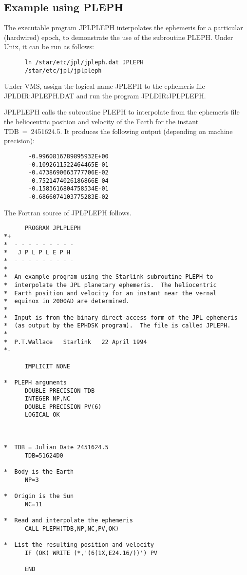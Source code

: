 \subsection{Example using PLEPH}
The executable program JPLPLEPH interpolates the ephemeris for a
particular (hardwired) epoch, to demonstrate
the use of the subroutine PLEPH. Under
Unix, it can be run as follows:
\begin{verbatim}
      ln /star/etc/jpl/jpleph.dat JPLEPH
      /star/etc/jpl/jplpleph
\end{verbatim}
Under VMS, assign the logical name JPLEPH to
the ephemeris file JPLDIR:JPLEPH.DAT
and run the program JPLDIR:JPLPLEPH.

JPLPLEPH calls the subroutine PLEPH to interpolate from the ephemeris file the
heliocentric position and velocity of the Earth for the instant
TDB~=~2451624.5.  It produces the following output (depending
on machine precision):

\begin{verbatim}
       -0.9960816789895932E+00
       -0.1092611522464465E-01
       -0.4738690663777706E-02
       -0.7521474026186866E-04
       -0.1583616804758534E-01
       -0.6866074103775283E-02
\end{verbatim}
The Fortran source of JPLPLEPH follows.
   
\begin{verbatim}
      PROGRAM JPLPLEPH
*+
*  - - - - - - - - -
*   J P L P L E P H
*  - - - - - - - - -
*
*  An example program using the Starlink subroutine PLEPH to
*  interpolate the JPL planetary ephemeris.  The heliocentric
*  Earth position and velocity for an instant near the vernal
*  equinox in 2000AD are determined.
*
*  Input is from the binary direct-access form of the JPL ephemeris
*  (as output by the EPHDSK program).  The file is called JPLEPH.
*
*  P.T.Wallace   Starlink   22 April 1994
*-

      IMPLICIT NONE

*  PLEPH arguments
      DOUBLE PRECISION TDB
      INTEGER NP,NC
      DOUBLE PRECISION PV(6)
      LOGICAL OK



*  TDB = Julian Date 2451624.5
      TDB=51624D0

*  Body is the Earth
      NP=3

*  Origin is the Sun
      NC=11

*  Read and interpolate the ephemeris
      CALL PLEPH(TDB,NP,NC,PV,OK)

*  List the resulting position and velocity
      IF (OK) WRITE (*,'(6(1X,E24.16/))') PV

      END
\end{verbatim}
\

